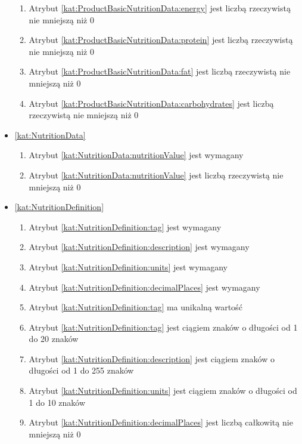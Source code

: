 \begin{itemize}[label={\textbf{Ograniczenia dla}}, wide, labelwidth=!, labelindent=0pt]
\begin{enumerate}[label={\textbf{OGR/\protect\threedigits{\arabic{enumi}}}}, wide, labelwidth=!, align=left, leftmargin=3cm, resume]
        \item Atrybut \ref{kat:ProductBasicNutritionData:energy} jest liczbą rzeczywistą nie mniejszą niż 0
        \item Atrybut \ref{kat:ProductBasicNutritionData:protein} jest liczbą rzeczywistą nie mniejszą niż 0
        \item Atrybut \ref{kat:ProductBasicNutritionData:fat} jest liczbą rzeczywistą nie mniejszą niż 0
        \item Atrybut \ref{kat:ProductBasicNutritionData:carbohydrates} jest liczbą rzeczywistą nie mniejszą niż 0
    \end{enumerate}

    \item\ref{kat:NutritionData}
    \begin{enumerate}[label={\textbf{OGR/\protect\threedigits{\arabic{enumi}}}}, wide, labelwidth=!, align=left, leftmargin=3cm, resume]
        \item Atrybut \ref{kat:NutritionData:nutritionValue} jest wymagany

        \item Atrybut \ref{kat:NutritionData:nutritionValue} jest liczbą rzeczywistą nie mniejszą niż 0
    \end{enumerate}

    \item\ref{kat:NutritionDefinition}
    \begin{enumerate}[label={\textbf{OGR/\protect\threedigits{\arabic{enumi}}}}, wide, labelwidth=!, align=left, leftmargin=3cm, resume]
        \item Atrybut \ref{kat:NutritionDefinition:tag} jest wymagany
        \item Atrybut \ref{kat:NutritionDefinition:description} jest wymagany
        \item Atrybut \ref{kat:NutritionDefinition:units} jest wymagany
        \item Atrybut \ref{kat:NutritionDefinition:decimalPlaces} jest wymagany

        \item Atrybut \ref{kat:NutritionDefinition:tag} ma unikalną wartość

        \item Atrybut \ref{kat:NutritionDefinition:tag} jest ciągiem znaków o długości od 1 do 20 znaków
        \item Atrybut \ref{kat:NutritionDefinition:description} jest ciągiem znaków o długości od 1 do 255 znaków
        \item Atrybut \ref{kat:NutritionDefinition:units} jest ciągiem znaków o długości od 1 do 10 znaków
        \item Atrybut \ref{kat:NutritionDefinition:decimalPlaces} jest liczbą całkowitą nie mniejszą niż 0
    \end{enumerate}


\end{itemize}
